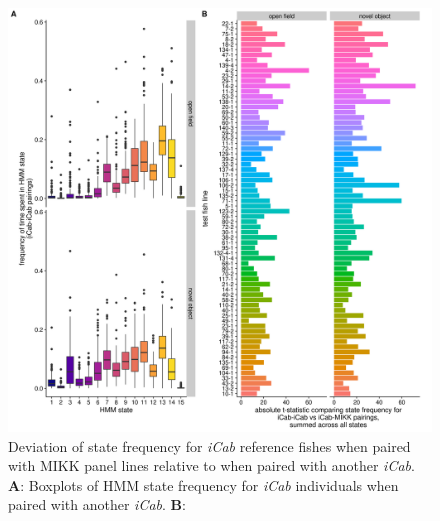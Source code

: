 \documentclass[
]{article}
\begin{document}
\begin{figure}
\includegraphics[width=1\linewidth]{figs/mikk_behaviour/0.08_15_deviation} \caption{Deviation of state frequency for \emph{\textcolor{iCab_424B4D}{iCab}} reference fishes when paired with MIKK panel lines relative to when paired with another \emph{\textcolor{iCab_424B4D}{iCab}}. \textbf{A}: Boxplots of HMM state frequency for \emph{\textcolor{iCab_424B4D}{iCab}} individuals when paired with another \emph{\textcolor{iCab_424B4D}{iCab}}. \textbf{B}:}\label{fig:F0-sge-deviation}
\end{figure}
\end{document}
